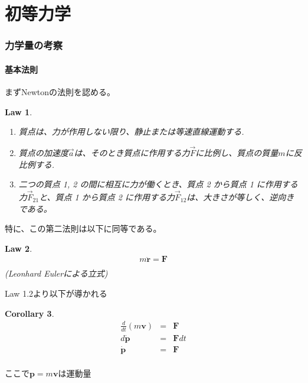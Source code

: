 \documentclass[dvipdfmx]{jsarticle}
\begin{document}
\newtheorem{law}{Law}[section]
\newtheorem{theo}[law]{Theorem}
\newtheorem{lemm}[law]{Lemma}
\newtheorem{cor}[law]{Corollary}
\newtheorem{defi}[law]{Definition}

\part{初等力学}

\section{力学量の考察}

\subsection{基本法則}
まずNewtonの法則を認める。
\begin{law}
\begin{enumerate}
\item 質点は、力が作用しない限り、静止または等速直線運動する. \\
\item 質点の加速度$ {\displaystyle {\vec {a}}} $は、そのとき質点に作用する力$ {\displaystyle {\vec {F}}} $に比例し、質点の質量$ {\displaystyle {m}} $に反比例する. \\
\item 二つの質点 1, 2 の間に相互に力が働くとき、質点 2 から質点 1 に作用する力$ {\displaystyle {{\vec {F}}_{21}}} $と、質点 1 から質点 2 に作用する力$ {\displaystyle {\vec {F}}_{12}} $は、大きさが等しく、逆向きである。
\end{enumerate}
\end{law}
特に、この第二法則は以下に同等である。
\begin{law}
\begin{eqnarray*}
m \ddot{\bm{r}} = \bm{F} \\
\end{eqnarray*}
(Leonhard Eulerによる立式)

\end{law}
Law 1.2より以下が導かれる
\begin{cor}
\begin{eqnarray*}
\frac{d}{dt} (m\bm{v}) &=& \bm{F} \\
d\dot{\bm{p}} &=& \bm{F}dt \\
\dot{\bm{p}} &=& \bm{F} \\
\end{eqnarray*}
\end{cor}
ここで$\bm{p}=m\bm{v}$は運動量
\end{document}
